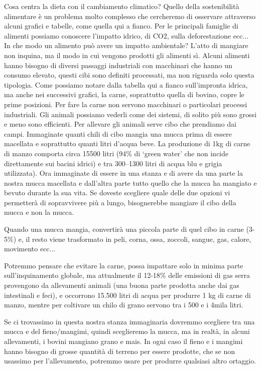 \documentclass[12pt]{book} %
\begin{document}
Cosa centra la dieta con il cambiamento climatico? Quello della sostenibilità alimentare è un problema molto complesso che cercheremo di osservare attraverso alcuni grafici e tabelle, come quella qui a fianco. Per le principali famiglie di alimenti possiamo conoscere l'impatto idrico, di CO2, sulla deforestazione ecc... In che modo un alimento può avere un impatto ambientale? L'atto di mangiare non inquina, ma il modo in cui vengono prodotti gli alimenti sì. Alcuni alimenti hanno bisogno di diversi passaggi industriali con macchinari che hanno un consumo elevato, questi cibi sono definiti processati, ma non riguarda solo questa tipologia. Come possiamo notare dalla tabella qui a fianco sull'impronta idrica, ma anche nei successivi grafici, la carne, soprattutto quella di bovino, copre le prime posizioni. Per fare la carne non servono macchinari o particolari processi industriali.
Gli animali possiamo vederli come dei sistemi, di solito più sono grossi e meno sono efficienti. Per allevare gli animali serve cibo che prendiamo dai campi. Immaginate quanti chili di cibo mangia una mucca prima di essere macellata e soprattutto quanti litri d'acqua beve. La produzione di 1kg di carne di manzo comporta circa 15500 litri (94\% di ‘green water’ che non incide direttamente sui bacini idrici) e tra 300–1300 litri di acqua blu e grigia utilizzata). Ora immaginate di essere in una stanza e di avere da una parte
la nostra mucca macellata e dall'altra parte tutto quello che la mucca ha mangiato e bevuto durante la sua vita.
Se doveste scegliere quale delle due opzioni vi permetterà di sopravvivere più a lungo, bisognerebbe mangiare il cibo della mucca e non la mucca.

Quando una mucca mangia, convertirà una piccola parte di quel cibo in carne (3-5\%) e, il resto viene trasformato in peli, corna, ossa, zoccoli, sangue, gas, calore, movimento ecc...

Potremmo pensare che evitare la carne, possa impattare solo in minima parte sull'inquinamento globale, ma attualmente il 12-18\% delle emissioni di gas serra provengono da allevamenti animali
(una buona parte prodotta anche dai gas intestinali e feci), e occorrono 15.500 litri di acqua per produrre 1 kg di carne di manzo, mentre per coltivare un chilo di grano servono tra i 500 e i 4mila litri.

Se ci trovassimo in questa nostra stanza immaginaria dovremmo scegliere tra una mucca e del fieno/mangimi,
quindi sceglieremo la mucca, ma in realtà, in alcuni allevamenti, i bovini mangiano grano e mais.
In ogni caso il fieno e i mangimi hanno bisogno di grosse quantità di terreno per essere prodotte, che se non usassimo per
l'allevamento, potremmo usare per produrre qualsiasi altro ortaggio.
\end{document}

